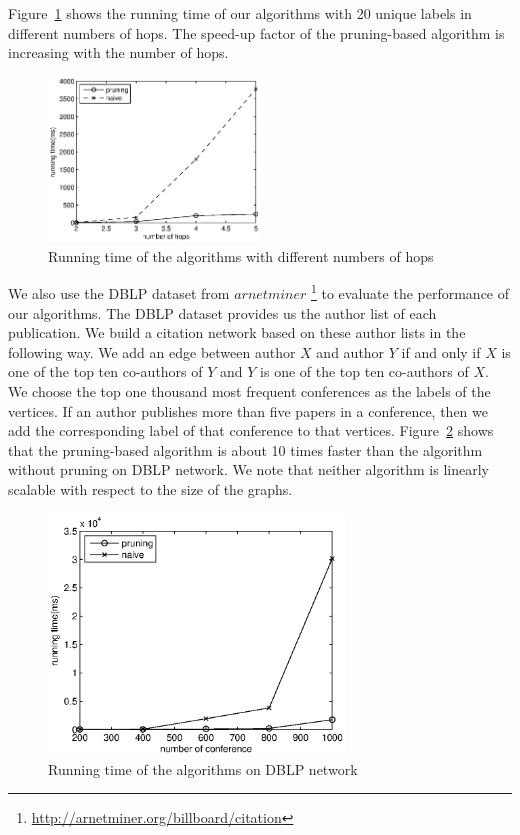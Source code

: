 Figure~\ref{fig:exp:fb_hops} shows the running time of our algorithms with 20 unique labels in different numbers of hops. The speed-up factor of the pruning-based algorithm is increasing with the number of hops.

\begin{figure}[H]
    \centering
      \includegraphics[width=0.5\textwidth]{figs/FB_hops}
    \caption{Running time of the algorithms with different numbers of hops}
    \label{fig:exp:fb_hops}
\end{figure}


We also use the DBLP dataset from $arnetminer$ \footnote{\url{http://arnetminer.org/billboard/citation}} to evaluate the performance of our algorithms. The DBLP dataset provides us the author list of each publication. We build a citation network based on these author lists in the following way. We add an edge between author $X$ and author $Y$ if and only if $X$ is one of the top ten co-authors of $Y$ and $Y$ is one of the top ten co-authors of $X$. We choose the top one thousand most frequent conferences as the labels of the vertices. If an author publishes more than five papers in a conference, then we add the corresponding label of that conference to that vertices. Figure~\ref{fig:exp:dblp} shows that the pruning-based algorithm is about 10 times faster than the algorithm without pruning on DBLP network. We note that neither algorithm is linearly scalable with respect to the size of the graphs.

\begin{figure}[H]
    \centering
      \includegraphics[width=0.7\textwidth]{figs/DBLP}
    \caption{Running time of the algorithms on DBLP network}
    \label{fig:exp:dblp}
\end{figure}

